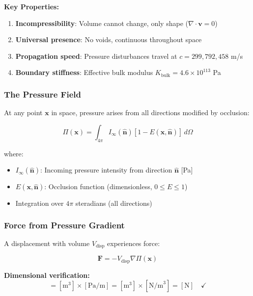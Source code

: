 \textbf{Key Properties:}

\begin{enumerate}
\item \textbf{Incompressibility}: Volume cannot change, only shape ($\nabla \cdot \mathbf{v} = 0$)
\item \textbf{Universal presence}: No voids, continuous throughout space
\item \textbf{Propagation speed}: Pressure disturbances travel at $c = 299{,}792{,}458$ m/s
\item \textbf{Boundary stiffness}: Effective bulk modulus $K_{\text{bulk}} = 4.6 \times 10^{113}$ Pa
\end{enumerate}

\subsubsection{The Pressure Field}

At any point $\mathbf{x}$ in space, pressure arises from all directions modified by occlusion:

\begin{equation}
\Pi(\mathbf{x}) = \int_{4\pi} I_\infty(\hat{\mathbf{n}}) [1 - E(\mathbf{x}, \hat{\mathbf{n}})] \, d\Omega
\label{eq:pressure_field}
\end{equation}

where:
\begin{itemize}
\item $I_\infty(\hat{\mathbf{n}})$: Incoming pressure intensity from direction $\hat{\mathbf{n}}$ [Pa]
\item $E(\mathbf{x}, \hat{\mathbf{n}})$: Occlusion function (dimensionless, $0 \leq E \leq 1$)
\item Integration over $4\pi$ steradians (all directions)
\end{itemize}

\subsubsection{Force from Pressure Gradient}

A displacement with volume $V_{\text{disp}}$ experiences force:

\begin{equation}
\mathbf{F} = -V_{\text{disp}} \nabla \Pi(\mathbf{x})
\label{eq:force_pressure}
\end{equation}

\textbf{Dimensional verification:}
\begin{equation}
[F] = [\text{m}^3] \times [\text{Pa/m}] = [\text{m}^3] \times [\text{N/m}^3] = [\text{N}] \quad \checkmark
\end{equation}

